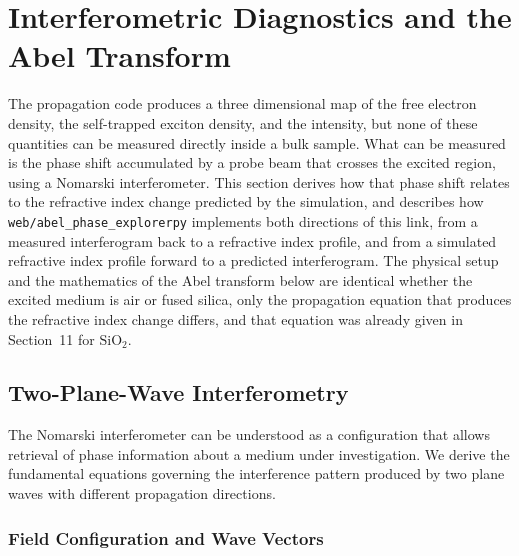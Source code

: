 \section{Interferometric Diagnostics and the Abel Transform}

The propagation code produces a three dimensional map of the free electron density, the self-trapped exciton density, and the intensity, but none of these quantities can be measured directly inside a bulk sample. What can be measured is the phase shift accumulated by a probe beam that crosses the excited region, using a Nomarski interferometer. This section derives how that phase shift relates to the refractive index change predicted by the simulation, and describes how \texttt{web/abel\_phase\_explorer\dotb py} implements both directions of this link, from a measured interferogram back to a refractive index profile, and from a simulated refractive index profile forward to a predicted interferogram. The physical setup and the mathematics of the Abel transform below are identical whether the excited medium is air or fused silica, only the propagation equation that produces the refractive index change differs, and that equation was already given in Section~11 for $\mathrm{SiO}_2$.

\subsection{Two-Plane-Wave Interferometry}

The Nomarski interferometer can be understood as a configuration that allows retrieval of phase information about a medium under investigation. We derive the fundamental equations governing the interference pattern produced by two plane waves with different propagation directions.

\subsubsection{Field Configuration and Wave Vectors}

